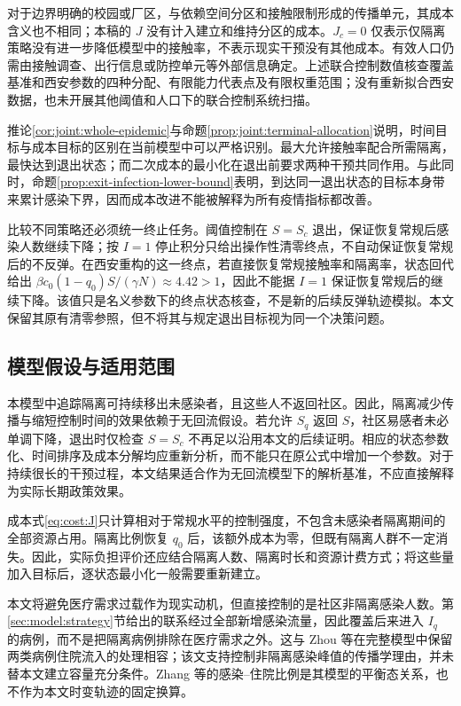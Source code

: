 \documentclass[lang=cn,a4paper,newtx]{elegantpaper}
\numberwithin{equation}{section}
\theoremstyle{plain}
\begin{document}
对于边界明确的校园或厂区，与依赖空间分区和接触限制形成的传播单元，其成本含义也不相同；本稿的 $J$ 没有计入建立和维持分区的成本。$J_c=0$ 仅表示仅隔离策略没有进一步降低模型中的接触率，不表示现实干预没有其他成本。有效人口仍需由接触调查、出行信息或防控单元等外部信息确定。上述联合控制数值核查覆盖基准和西安参数的四种分配、有限能力代表点及有限权重范围；没有重新拟合西安数据，也未开展其他阈值和人口下的联合控制系统扫描。

推论\ref{cor:joint:whole-epidemic}与命题\ref{prop:joint:terminal-allocation}说明，时间目标与成本目标的区别在当前模型中可以严格识别。最大允许接触率配合所需隔离，最快达到退出状态；而二次成本的最小化在退出前要求两种干预共同作用。与此同时，命题\ref{prop:exit-infection-lower-bound}表明，到达同一退出状态的目标本身带来累计感染下界，因而成本改进不能被解释为所有疫情指标都改善。

比较不同策略还必须统一终止任务。阈值控制在 $S=S_c$ 退出，保证恢复常规后感染人数继续下降；按 $I=1$ 停止积分只给出操作性清零终点，不自动保证恢复常规后的不反弹。在西安重构的这一终点，若直接恢复常规接触率和隔离率，状态回代给出 $\beta c_0(1-q_0)S/(\gamma N)\approx4.42>1$，因此不能据 $I=1$ 保证恢复常规后的继续下降。该值只是名义参数下的终点状态核查，不是新的后续反弹轨迹模拟。本文保留其原有清零参照，但不将其与规定退出目标视为同一个决策问题。

\subsection{模型假设与适用范围}
本模型中追踪隔离可持续移出未感染者，且这些人不返回社区。因此，隔离减少传播与缩短控制时间的效果依赖于无回流假设。若允许 $S_q$ 返回 $S$，社区易感者未必单调下降，退出时仅检查 $S=S_c$ 不再足以沿用本文的后续证明。相应的状态参数化、时间排序及成本分解均应重新分析，而不能只在原公式中增加一个参数。对于持续很长的干预过程，本文结果适合作为无回流模型下的解析基准，不应直接解释为实际长期政策效果。

成本式\eqref{eq:cost:J}只计算相对于常规水平的控制强度，不包含未感染者隔离期间的全部资源占用。隔离比例恢复 $q_0$ 后，该额外成本为零，但既有隔离人群不一定消失。因此，实际负担评价还应结合隔离人数、隔离时长和资源计费方式；将这些量加入目标后，逐状态最小化一般需要重新建立。

本文将避免医疗需求过载作为现实动机，但直接控制的是社区非隔离感染人数。第\ref{sec:model:strategy}节给出的联系经过全部新增感染流量，因此覆盖后来进入 $I_q$ 的病例，而不是把隔离病例排除在医疗需求之外。这与 Zhou 等\cite{Zhou2024SPCI}在完整模型中保留两类病例住院流入的处理相容；该文支持控制非隔离感染峰值的传播学理由，并未替本文建立容量充分条件。Zhang 等\cite[注记1]{Zhang2026Behavior}的感染--住院比例是其模型的平衡态关系，也不作为本文时变轨迹的固定换算。
\end{document}
